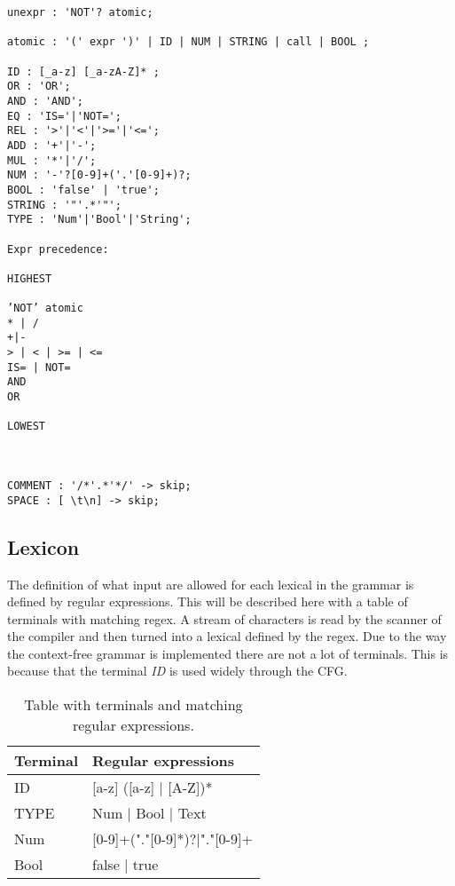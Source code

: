 \begin{lstlisting}[style=MyLang]
unexpr : 'NOT'? atomic;

atomic : '(' expr ')' | ID | NUM | STRING | call | BOOL ;

ID : [_a-z] [_a-zA-Z]* ;
OR : 'OR';
AND : 'AND';
EQ : 'IS='|'NOT=';
REL : '>'|'<'|'>='|'<=';
ADD : '+'|'-';
MUL : '*'|'/';
NUM : '-'?[0-9]+('.'[0-9]+)?;
BOOL : 'false' | 'true';
STRING : '"'.*'"';
TYPE : 'Num'|'Bool'|'String';

Expr precedence:
 
HIGHEST
 
’NOT’ atomic
* | /
+|-
> | < | >= | <=
IS= | NOT=
AND
OR
 
LOWEST



COMMENT : '/*'.*'*/' -> skip;
SPACE : [ \t\n] -> skip;

\end{lstlisting}


\subsection{Lexicon}
The definition of what input are allowed for each lexical in the grammar is defined by regular expressions. This will be described here with a table of terminals with matching regex. A stream of characters is read by the scanner of the compiler and then turned into a lexical defined by the regex.
Due to the way the context-free grammar is implemented there are not a lot of terminals. This is because that the terminal \emph{ID} is used widely through the CFG.  

\begin{table}[]
\centering
\label{fig:Lexicon}
\begin{tabular}{|l|l|}
\hline
Terminal & Regular expressions                \\ \hline
ID       & {[}a-z{]} ({[}a-z{]} | {[}A-Z{]})* \\ \hline
TYPE     & Num | Bool | Text                  \\ \hline
Num		 & [0-9]+("."[0-9]*)?|"."[0-9]+		  \\ \hline
Bool 	 & false | true						  \\ \hline
\end{tabular}
\caption{Table with terminals and matching regular expressions.}
\end{table}

